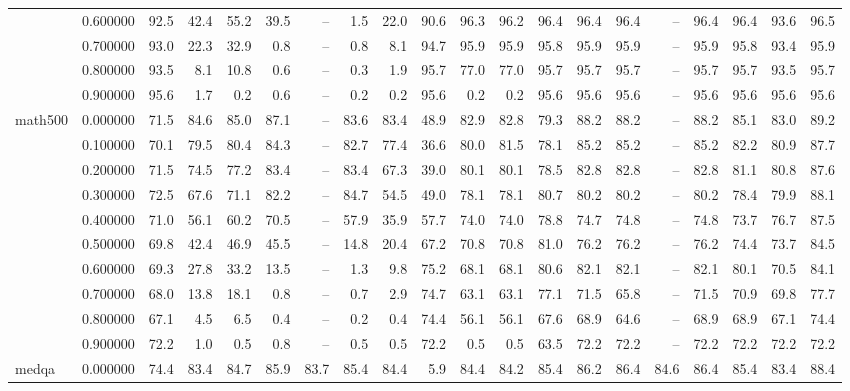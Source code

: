 \begin{tabular}{llrrrrrrrrrrrrrrrrrr}
 & 0.600000 & 92.5 & 42.4 & 55.2 & 39.5 & -- & 1.5 & 22.0 & 90.6 & 96.3 & 96.2 & 96.4 & 96.4 & 96.4 & -- & 96.4 & 96.4 & 93.6 & 96.5 \\
 & 0.700000 & 93.0 & 22.3 & 32.9 & 0.8 & -- & 0.8 & 8.1 & 94.7 & 95.9 & 95.9 & 95.8 & 95.9 & 95.9 & -- & 95.9 & 95.8 & 93.4 & 95.9 \\
 & 0.800000 & 93.5 & 8.1 & 10.8 & 0.6 & -- & 0.3 & 1.9 & 95.7 & 77.0 & 77.0 & 95.7 & 95.7 & 95.7 & -- & 95.7 & 95.7 & 93.5 & 95.7 \\
 & 0.900000 & 95.6 & 1.7 & 0.2 & 0.6 & -- & 0.2 & 0.2 & 95.6 & 0.2 & 0.2 & 95.6 & 95.6 & 95.6 & -- & 95.6 & 95.6 & 95.6 & 95.6 \\
\cline{1-20}
\multirow[t]{10}{*}{math500} & 0.000000 & 71.5 & 84.6 & 85.0 & 87.1 & -- & 83.6 & 83.4 & 48.9 & 82.9 & 82.8 & 79.3 & 88.2 & 88.2 & -- & 88.2 & 85.1 & 83.0 & 89.2 \\
 & 0.100000 & 70.1 & 79.5 & 80.4 & 84.3 & -- & 82.7 & 77.4 & 36.6 & 80.0 & 81.5 & 78.1 & 85.2 & 85.2 & -- & 85.2 & 82.2 & 80.9 & 87.7 \\
 & 0.200000 & 71.5 & 74.5 & 77.2 & 83.4 & -- & 83.4 & 67.3 & 39.0 & 80.1 & 80.1 & 78.5 & 82.8 & 82.8 & -- & 82.8 & 81.1 & 80.8 & 87.6 \\
 & 0.300000 & 72.5 & 67.6 & 71.1 & 82.2 & -- & 84.7 & 54.5 & 49.0 & 78.1 & 78.1 & 80.7 & 80.2 & 80.2 & -- & 80.2 & 78.4 & 79.9 & 88.1 \\
 & 0.400000 & 71.0 & 56.1 & 60.2 & 70.5 & -- & 57.9 & 35.9 & 57.7 & 74.0 & 74.0 & 78.8 & 74.7 & 74.8 & -- & 74.8 & 73.7 & 76.7 & 87.5 \\
 & 0.500000 & 69.8 & 42.4 & 46.9 & 45.5 & -- & 14.8 & 20.4 & 67.2 & 70.8 & 70.8 & 81.0 & 76.2 & 76.2 & -- & 76.2 & 74.4 & 73.7 & 84.5 \\
 & 0.600000 & 69.3 & 27.8 & 33.2 & 13.5 & -- & 1.3 & 9.8 & 75.2 & 68.1 & 68.1 & 80.6 & 82.1 & 82.1 & -- & 82.1 & 80.1 & 70.5 & 84.1 \\
 & 0.700000 & 68.0 & 13.8 & 18.1 & 0.8 & -- & 0.7 & 2.9 & 74.7 & 63.1 & 63.1 & 77.1 & 71.5 & 65.8 & -- & 71.5 & 70.9 & 69.8 & 77.7 \\
 & 0.800000 & 67.1 & 4.5 & 6.5 & 0.4 & -- & 0.2 & 0.4 & 74.4 & 56.1 & 56.1 & 67.6 & 68.9 & 64.6 & -- & 68.9 & 68.9 & 67.1 & 74.4 \\
 & 0.900000 & 72.2 & 1.0 & 0.5 & 0.8 & -- & 0.5 & 0.5 & 72.2 & 0.5 & 0.5 & 63.5 & 72.2 & 72.2 & -- & 72.2 & 72.2 & 72.2 & 72.2 \\
\cline{1-20}
\multirow[t]{10}{*}{medqa} & 0.000000 & 74.4 & 83.4 & 84.7 & 85.9 & 83.7 & 85.4 & 84.4 & 5.9 & 84.4 & 84.2 & 85.4 & 86.2 & 86.4 & 84.6 & 86.4 & 85.4 & 83.4 & 88.4 \\

\end{tabular}
